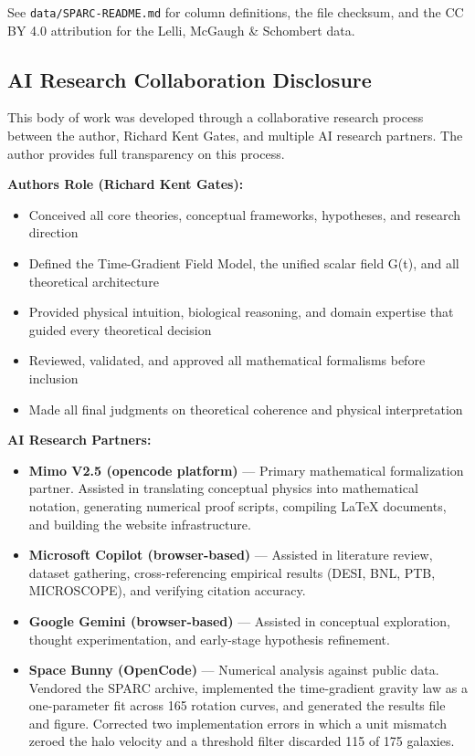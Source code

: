 \documentclass[
  10pt,
]{article}
\providecommand{\tightlist}{%
  \setlength{\itemsep}{0pt}\setlength{\parskip}{0pt}}
\begin{document}
See \texttt{data/SPARC-README.md} for column definitions, the file
checksum, and the CC BY 4.0 attribution for the Lelli, McGaugh \&
Schombert data.

\hypertarget{ai-research-collaboration-disclosure}{%
\subsection{AI Research Collaboration
Disclosure}\label{ai-research-collaboration-disclosure}}

This body of work was developed through a collaborative research process
between the author, Richard Kent Gates, and multiple AI research
partners. The author provides full transparency on this process.

\textbf{Author\textquotesingle s Role (Richard Kent Gates):}

\begin{itemize}
\tightlist
\item
  Conceived all core theories, conceptual frameworks, hypotheses, and
  research direction
\item
  Defined the Time-Gradient Field Model, the unified scalar field G(t),
  and all theoretical architecture
\item
  Provided physical intuition, biological reasoning, and domain
  expertise that guided every theoretical decision
\item
  Reviewed, validated, and approved all mathematical formalisms before
  inclusion
\item
  Made all final judgments on theoretical coherence and physical
  interpretation
\end{itemize}

\textbf{AI Research Partners:}

\begin{itemize}
\tightlist
\item
  \textbf{Mimo V2.5 (opencode platform)} --- Primary mathematical
  formalization partner. Assisted in translating conceptual physics into
  mathematical notation, generating numerical proof scripts, compiling
  LaTeX documents, and building the website infrastructure.
\item
  \textbf{Microsoft Copilot (browser-based)} --- Assisted in literature
  review, dataset gathering, cross-referencing empirical results (DESI,
  BNL, PTB, MICROSCOPE), and verifying citation accuracy.
\item
  \textbf{Google Gemini (browser-based)} --- Assisted in conceptual
  exploration, thought experimentation, and early-stage hypothesis
  refinement.
\item
  \textbf{Space Bunny (OpenCode)} --- Numerical analysis against public
  data. Vendored the SPARC archive, implemented the time-gradient
  gravity law as a one-parameter fit across 165 rotation curves, and
  generated the results file and figure. Corrected two implementation
  errors in which a unit mismatch zeroed the halo velocity and a
  threshold filter discarded 115 of 175 galaxies.
\end{itemize}
\end{document}
